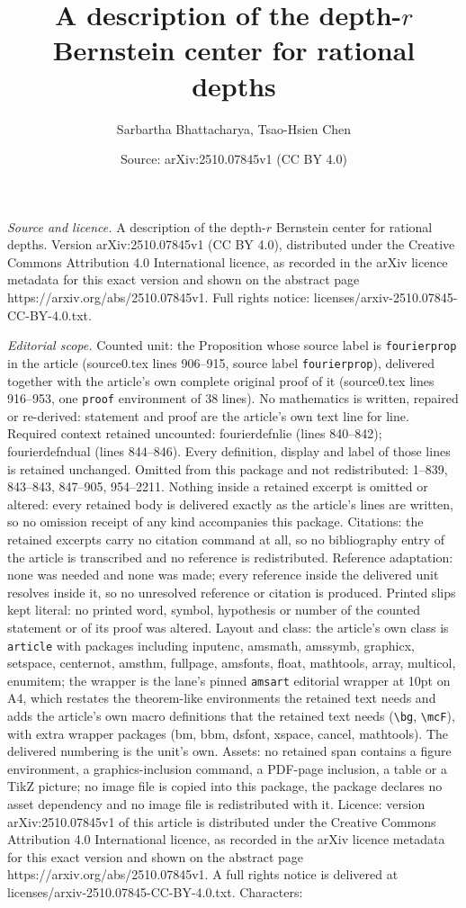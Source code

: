 \documentclass[10pt,a4paper]{amsart}
\title[A description of the depth-$r$ Bernstein center for rational]{A description of the depth-$r$ Bernstein center for rational depths}
\author{Sarbartha Bhattacharya, Tsao-Hsien Chen}
\date{Source: arXiv:2510.07845v1 (CC BY 4.0)}
\begin{document}
\maketitle

\noindent\emph{Source and licence.} A description of the depth-$r$ Bernstein center for rational depths. Version arXiv:2510.07845v1 (CC BY 4.0), distributed under the Creative Commons Attribution 4.0 International licence, as recorded in the arXiv licence metadata for this exact version and shown on the abstract page https://arxiv.org/abs/2510.07845v1. Full rights notice: licenses/arxiv-2510.07845-CC-BY-4.0.txt.\par\smallskip

\noindent\textit{Editorial scope.} Counted unit: the Proposition whose source label is \texttt{fourierprop} in the article (source0.tex lines 906--915, source label \texttt{fourierprop}), delivered together with the article's own complete original proof of it (source0.tex lines 916--953, one \texttt{proof} environment of 38 lines). No mathematics is written, repaired or re-derived: statement and proof are the article's own text line for line. Required context retained uncounted: fourierdefnlie (lines 840--842); fourierdefndual (lines 844--846). Every definition, display and label of those lines is retained unchanged. Omitted from this package and not redistributed: 1--839, 843--843, 847--905, 954--2211. Nothing inside a retained excerpt is omitted or altered: every retained body is delivered exactly as the article's lines are written, so no omission receipt of any kind accompanies this package. Citations: the retained excerpts carry no citation command at all, so no bibliography entry of the article is transcribed and no reference is redistributed. Reference adaptation: none was needed and none was made; every reference inside the delivered unit resolves inside it, so no unresolved reference or citation is produced. Printed slips kept literal: no printed word, symbol, hypothesis or number of the counted statement or of its proof was altered. Layout and class: the article's own class is \texttt{article} with packages including inputenc, amsmath, amssymb, graphicx, setspace, centernot, amsthm, fullpage, amsfonts, float, mathtools, array, multicol, enumitem; the wrapper is the lane's pinned \texttt{amsart} editorial wrapper at 10pt on A4, which restates the theorem-like environments the retained text needs and adds the article's own macro definitions that the retained text needs (\texttt{\textbackslash bg}, \texttt{\textbackslash mcF}), with extra wrapper packages (bm, bbm, dsfont, xspace, cancel, mathtools). The delivered numbering is the unit's own. Assets: no retained span contains a figure environment, a graphics-inclusion command, a PDF-page inclusion, a table or a TikZ picture; no image file is copied into this package, the package declares no asset dependency and no image file is redistributed with it. Licence: version arXiv:2510.07845v1 of this article is distributed under the Creative Commons Attribution 4.0 International licence, as recorded in the arXiv licence metadata for this exact version and shown on the abstract page https://arxiv.org/abs/2510.07845v1. A full rights notice is delivered at licenses/arxiv-2510.07845-CC-BY-4.0.txt. Characters: 
\end{document}
